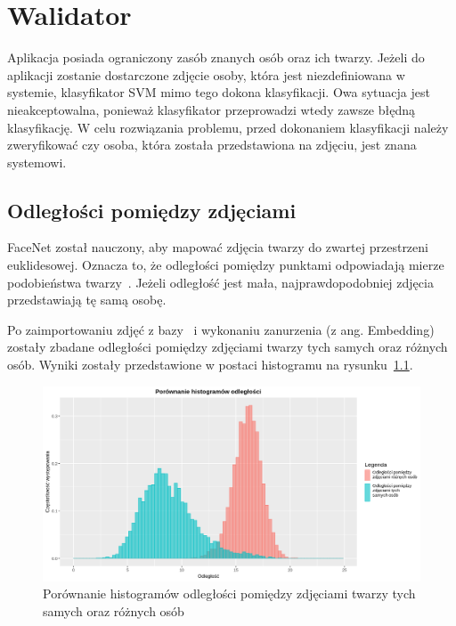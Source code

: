 \chapter{Walidator}

Aplikacja posiada ograniczony zasób znanych osób oraz ich twarzy.
Jeżeli do aplikacji zostanie dostarczone zdjęcie osoby, która jest niezdefiniowana w systemie, klasyfikator SVM mimo
tego dokona klasyfikacji.
Owa sytuacja jest nieakceptowalna, ponieważ klasyfikator przeprowadzi wtedy zawsze błędną klasyfikację.
W celu rozwiązania problemu, przed dokonaniem klasyfikacji należy zweryfikować czy osoba,
która została przedstawiona na zdjęciu, jest znana systemowi.


\section{Odległości pomiędzy zdjęciami}

FaceNet został nauczony, aby mapować zdjęcia twarzy do zwartej przestrzeni euklidesowej.
Oznacza to, że odległości pomiędzy punktami odpowiadają mierze podobieństwa twarzy~\cite{schroff2015facenet}.
Jeżeli odległość jest mała, najprawdopodobniej zdjęcia przedstawiają tę samą osobę.

Po zaimportowaniu zdjęć z bazy~\cite{liu2015faceattributes} i wykonaniu zanurzenia (z ang. Embedding)
zostały zbadane odległości pomiędzy zdjęciami twarzy tych samych oraz różnych osób.
Wyniki zostały przedstawione w postaci histogramu na rysunku~\ref{fig:porownanie_histogramow_odleglosci}.

\begin{figure}[H]
    \centering
    \includegraphics[width=1\textwidth]{./images/porownanie_histogramow_odleglosci}
    \caption{ Porównanie histogramów odległości pomiędzy zdjęciami twarzy tych samych oraz różnych osób }
    \customsource
    \label{fig:porownanie_histogramow_odleglosci}
\end{figure}

